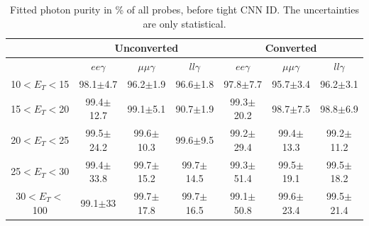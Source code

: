\begin{table}[htbp]
\raggedleft
\begin{longtable}[c]{ccccccc}
\hline\hline
                             & \multicolumn{3}{c}{Unconverted}               & \multicolumn{3}{c}{Converted}                \\
                            \hline
\endfirsthead
%
\endhead
%
                             & $ee\gamma$           & $\mu\mu\gamma$           & $ll\gamma$           & $ee\gamma$           &  $\mu\mu\gamma$          & $ll\gamma$           \\
    \hline
10$<E_T<$15 & 98.1$\pm$4.7   &   96.2$\pm$1.9   &   96.6$\pm$1.8   &   97.8$\pm$7.7   &   95.7$\pm$3.4    &   96.2$\pm$3.1  \\
15$<E_T<$20 & 99.4$\pm$12.7  &   99.1$\pm$5.1   &   90.7$\pm$1.9   &   99.3$\pm$20.2  &   98.7$\pm$7.5    &   98.8$\pm$6.9  \\
20$<E_T<$25 & 99.5$\pm$24.2  &   99.6$\pm$10.3  &   99.6$\pm$9.5   &   99.2$\pm$29.4  &   99.4$\pm$13.3   &   99.2$\pm$11.2 \\
25$<E_T<$30 & 99.4$\pm$33.8  &   99.7$\pm$15.2  &   99.7$\pm$14.5  &   99.3$\pm$51.4  &   99.5$\pm$19.1   &   99.5$\pm$18.2    \\
30$<E_T<$100 & 99.1$\pm$33   &   99.7$\pm$17.8  &   99.7$\pm$16.5  &   99.1$\pm$50.8  &   99.6$\pm$23.4   &   99.5$\pm$21.4 \\
\hline\hline
\end{longtable}
\begin{tcolorbox}[colback=black!5!white,colframe=white!75!black]
\caption{Fitted photon purity in \% of all probes, before tight CNN ID. The uncertainties are only statistical.}
\label{tab:gamma:CNN:Zllg:Purity:B}
\end{tcolorbox}

\end{table}

